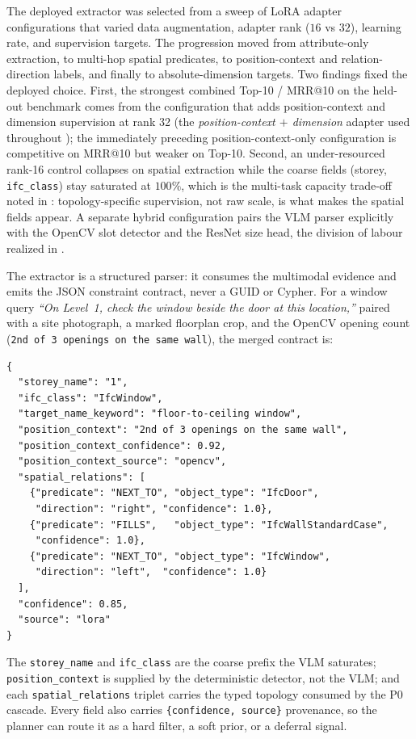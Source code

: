 The deployed extractor was selected from a sweep of LoRA adapter configurations that varied data
augmentation, adapter rank ($16$ vs $32$), learning rate, and supervision targets. The progression
moved from attribute-only extraction, to multi-hop spatial predicates, to position-context and
relation-direction labels, and finally to absolute-dimension targets. Two findings fixed the deployed
choice. First, the strongest combined Top-10 / MRR@10 on the held-out benchmark comes from the
configuration that adds position-context and dimension supervision at rank 32 (the \emph{position-context
$+$ dimension} adapter used throughout ); the immediately preceding
position-context-only configuration is competitive on MRR@10 but weaker on Top-10. Second, an
under-resourced rank-16 control collapses on spatial extraction while the coarse fields (storey,
\texttt{ifc\_class}) stay saturated at $100\%$, which is the multi-task capacity trade-off noted in
: topology-specific supervision, not raw scale, is what makes the spatial fields
appear. A separate hybrid configuration pairs the VLM parser explicitly with the OpenCV slot detector
and the ResNet size head, the division of labour realized in .

The extractor is a structured parser: it consumes the multimodal evidence and emits the JSON
constraint contract, never a GUID or Cypher. For a window query \emph{``On Level~1, check the window
beside the door at this location,''} paired with a site photograph, a marked floorplan crop, and the
OpenCV opening count (\texttt{2nd of 3 openings on the same wall}), the merged contract is:

{\small
\begin{verbatim}
{
  "storey_name": "1",
  "ifc_class": "IfcWindow",
  "target_name_keyword": "floor-to-ceiling window",
  "position_context": "2nd of 3 openings on the same wall",
  "position_context_confidence": 0.92,
  "position_context_source": "opencv",
  "spatial_relations": [
    {"predicate": "NEXT_TO", "object_type": "IfcDoor",
     "direction": "right", "confidence": 1.0},
    {"predicate": "FILLS",   "object_type": "IfcWallStandardCase",
     "confidence": 1.0},
    {"predicate": "NEXT_TO", "object_type": "IfcWindow",
     "direction": "left",  "confidence": 1.0}
  ],
  "confidence": 0.85,
  "source": "lora"
}
\end{verbatim}
}

\noindent The \texttt{storey\_name} and \texttt{ifc\_class} are the coarse prefix the VLM saturates;
\texttt{position\_context} is supplied by the deterministic detector, not the VLM; and each
\texttt{spatial\_relations} triplet carries the typed topology consumed by the P0 cascade. Every
field also carries \texttt{\{confidence, source\}} provenance, so the planner can route it as a hard
filter, a soft prior, or a deferral signal.
\clearpage

